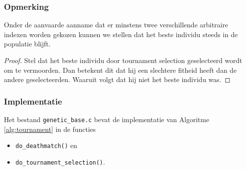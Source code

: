 
\subsubsection{Opmerking}
\label{ssub:notetournament}
Onder de aanvaarde aanname dat er minstens twee verschillende arbitraire indexen worden gekozen kunnen we stellen dat het beste individu steeds in de populatie blijft.
\begin{proof}
Stel dat het beste individu door tournament selection geselecteerd wordt om te vermoorden. Dan betekent dit dat hij een slechtere fitheid heeft dan de andere geselecteerden. Waaruit volgt dat hij niet het beste individu was.  \Lightning
\end{proof}

\subsubsection{Implementatie}
Het bestand \texttt{genetic\_base.c} bevat de implementatie van Algoritme \ref{alg:tournament} in de functies \begin{itemize}
  \setlength{\itemsep}{1pt}
  \setlength{\parskip}{0pt}
  \setlength{\parsep}{0pt}
\item\texttt{do\_deathmatch()} en
\item\texttt{do\_tournament\_selection()}.
 \end{itemize}  


%